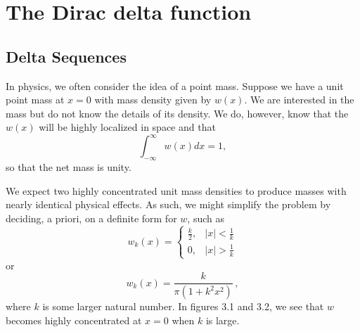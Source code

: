 \section{The Dirac delta function}
\setcounter{example}{0}
\subsection{Delta Sequences}
In physics, we often consider the idea of a point mass. Suppose we have a unit point mass at \(x=0\) with mass density given by \(w(x)\). We are interested in the mass but do not know the details of its density. We do, however, know that the \(w(x)\) will be highly localized in space and that 
\begin{equation}
    \int_{-\infty}^{\infty} w(x) dx = 1,
\end{equation}
so that the net mass is unity.

We expect two highly concentrated unit mass densities to produce masses with nearly identical physical effects. As such, we might simplify the problem by deciding, a priori, on a definite form for \(w\), such as
\begin{equation}
    w_k(x) = \begin{cases}
        \frac{k}{2}, & |x|<\frac{1}{k}\\
        0, & |x|>\frac{1}{k}
    \end{cases}
\end{equation}
or
\begin{equation}
    w_k(x)=\frac{k}{\pi (1+k^2x^2)}\,,
\end{equation}
where \(k\) is some larger natural number. In figures 3.1 and 3.2, we see that \(w\) becomes highly concentrated at \(x=0\) when \(k\) is large.

